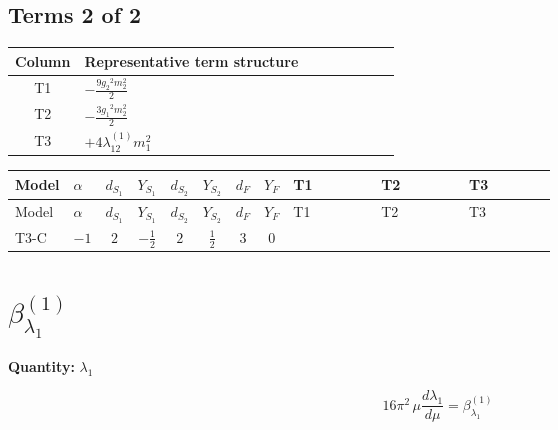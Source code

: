 \documentclass[8pt]{article}
\begin{document}
\begin{landscape}
\subsection*{Terms 2 of 2}
\begin{center}
\begin{tabular}{@{}c >{\raggedright\arraybackslash}p{0.82\linewidth}@{}}
\toprule
Column & Representative term structure \\
\midrule
T1 & \(\displaystyle -\frac{9 {g_2}^2 {m_2^2}}{2}\) \\
\midrule
T2 & \(\displaystyle -\frac{3 {g_1}^2 {m_2^2}}{2}\) \\
\midrule
T3 & \(\displaystyle +4 {\lambda_{12}^{(1)}} {m_1^2}\) \\
\midrule
\bottomrule
\end{tabular}
\end{center}
\smallskip
\tiny
\begin{longtable}{@{}llcccccc >{\raggedright\arraybackslash}p{0.21\linewidth} >{\raggedright\arraybackslash}p{0.21\linewidth} >{\raggedright\arraybackslash}p{0.21\linewidth}@{}}
\toprule
Model & $\alpha$ & $d_{S_1}$ & $Y_{S_1}$ & $d_{S_2}$ & $Y_{S_2}$ & $d_F$ & $Y_F$ & T1 & T2 & T3 \\
\midrule
\endfirsthead
\toprule
Model & $\alpha$ & $d_{S_1}$ & $Y_{S_1}$ & $d_{S_2}$ & $Y_{S_2}$ & $d_F$ & $Y_F$ & T1 & T2 & T3 \\
\midrule
\endhead
T3-C & $-1$ & $2$ & $-\frac{1}{2}$ & $2$ & $\frac{1}{2}$ & $3$ & $0$ & \scriptsize\adjustbox{max width=\linewidth}{$\begin{gathered} -\frac{9 {g_2}^2 {m_2^2}}{2}\end{gathered}$} & \scriptsize\adjustbox{max width=\linewidth}{$\begin{gathered} -\frac{3 {g_1}^2 {m_2^2}}{2}\end{gathered}$} & \scriptsize\adjustbox{max width=\linewidth}{$\begin{gathered} +4 {\lambda_{12}^{(1)}} {m_1^2}\end{gathered}$} \\
\midrule
\bottomrule
\end{longtable}
\clearpage
\section*{$\beta_{\lambda_1}^{(1)}$}
\noindent\textbf{Quantity: }$\lambda_1$\par\smallskip
\[16\pi^2\,\mu\frac{d \lambda_1}{d\mu}=\beta_{\lambda_1}^{(1)}\]

\end{landscape}
\end{document}

